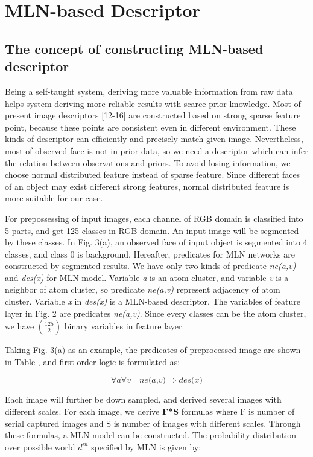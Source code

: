 \documentclass[journal]{IEEEtran}
\begin{document}
\section{MLN-based Descriptor}
\subsection{The concept of constructing MLN-based descriptor}
Being a self-taught system, deriving more valuable information from raw data helps system deriving more reliable results with scarce prior knowledge. Most of present image descriptors [12-16] are constructed based on strong sparse feature point, because these points are consistent even in different environment. These kinds of descriptor can efficiently and precisely match given image. Nevertheless, most of observed face is not in prior data, so we need a descriptor which can infer the relation between observations and priors. To avoid losing information, we choose normal distributed feature instead of sparse feature. Since different faces of an object may exist different strong features, normal distributed feature is more suitable for our case. 

For prepossessing of input images, each channel of RGB domain is classified into 5 parts, and get 125 classes in RGB domain. An input image will be segmented by these classes. In Fig. 3(a), an observed face of input object is segmented into 4 classes, and class 0 is background. Hereafter, predicates for MLN networks are constructed by segmented results. We have only two kinds of predicate \textit{ne(a,v)} and  \textit{des(x)} for MLN model. Variable \textit{a} is an atom cluster, and variable \textit{v} is a neighbor of atom cluster, so predicate \textit{ne(a,v)} represent adjacency of atom cluster. Variable \textit{x} in \textit{des(x)} is a MLN-based descriptor. The variables of feature layer in Fig. 2 are predicates \textit{ne(a,v)}. Since every classes can be the atom cluster, we have $\binom{125}{2}$ binary variables in feature layer.

Taking Fig. 3(a) as an example, the predicates of preprocessed image are shown in Table \uppercase\expandafter{}, and first order logic is formulated as:

\begin{equation}
\forall{a}\forall{v}\quad\textit{ne(a,v)}\Rightarrow\textit{des(x)}
\end{equation}

Each image will further be down sampled, and derived several images with different scales. For each image, we derive  \textbf{F*S} formulas where F is number of serial captured images and S is number of images with different scales. Through these formulas, a MLN model can be constructed. The probability distribution over possible world $d^{in}$ specified by MLN is given by:
\end{document}
